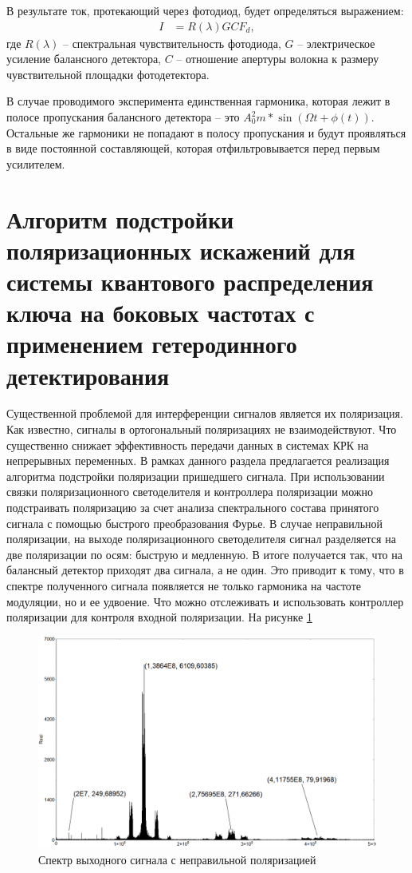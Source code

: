 В результате ток, протекающий через фотодиод, будет определяться выражением:
\begin{align}
   I &= R(\lambda)G C F_d,
\end{align} 
где $R(\lambda)$ -- спектральная чувствительность фотодиода, $G$ -- электрическое усиление балансного детектора, $C$ -- отношение апертуры волокна к размеру чувствительной площадки фотодетектора. 

В случае проводимого эксперимента единственная гармоника, которая лежит в полосе пропускания балансного детектора -- это $A_0^2m*\sin(\Omega t   + \phi (t))$.
Остальные же гармоники не попадают в полосу пропускания и будут проявляться в виде постоянной составляющей, которая отфильтровывается перед первым усилителем. 

\section{Алгоритм подстройки поляризационных искажений для системы квантового распределения ключа на боковых частотах с применением гетеродинного детектирования}\label{sec:ch3/sect4}
Существенной проблемой для интерференции сигналов является их поляризация. Как известно, сигналы в ортогональный поляризациях не взаимодействуют. Что существенно снижает эффективность передачи данных в системах КРК на непрерывных переменных. В рамках данного раздела предлагается реализация алгоритма подстройки поляризации пришедшего сигнала.
При использовании связки поляризационного светоделителя и контроллера поляризации можно подстраивать поляризацию за счет анализа спектрального состава принятого сигнала с помощью быстрого преобразования Фурье. В случае неправильной поляризации, на выходе поляризационного светоделителя сигнал разделяется на две поляризации по осям: быструю и медленную. В итоге получается так, что на балансный детектор приходят два сигнала, а не один. Это приводит к тому, что в спектре полученного сигнала появляется не только гармоника на частоте модуляции, но и ее удвоение. Что можно отслеживать и использовать контроллер поляризации для контроля входной поляризации. На рисунке \ref{fig:ruin pol}
\begin{figure}
    \centering
    \includegraphics[width = \linewidth]{images/Spectrum of ruined polarization.png}
    \caption{Спектр выходного сигнала с неправильной поляризацией }
    \label{fig:ruin pol}
\end{figure}
